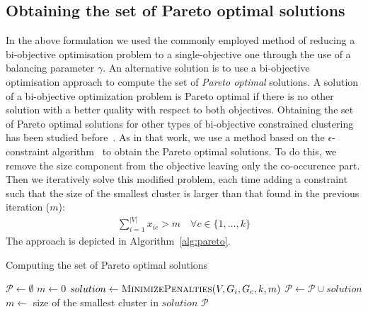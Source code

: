 \documentclass[conference]{IEEEtran}
\newcommand{\NDTi}[1]{\todo[inline,bordercolor=ghue,color=ghue!40]{Tias: #1}}
\begin{document}
\subsection{Obtaining the set of Pareto optimal solutions}
In the above formulation we used the commonly employed method of reducing a bi-objective optimisation problem to a single-objective one through the use of a balancing parameter $\gamma$. An alternative solution is to use a bi-objective optimisation approach to compute the set of \emph{Pareto optimal} solutions. A solution of a bi-objective optimization problem is Pareto optimal if there is no other solution with a better quality with respect to both objectives. Obtaining the set of Pareto optimal solutions for other types of bi-objective constrained clustering has been studied before~\cite{GunsDVD16}. As in that work, we use a method based on the $\epsilon$-constraint algorithm~\cite{DBLP0015143} to obtain the Pareto optimal solutions. To do this, we remove the size component from the objective leaving only the co-occurence part. Then we iteratively solve this modified problem, each time adding a constraint such that the size of the smallest cluster is larger than that found in the previous iteration ($m$):
%
\begin{align}
\sum_{i=1}^{|V|} x_{ic} > m \quad \forall c \in \{1, \ldots, k\}
\end{align}
The approach is depicted in Algorithm~\ref{alg:pareto}.

\begin{algorithm}[t]
\centering
\caption{Computing the set of Pareto optimal solutions}
\label{alg:pareto}
\begin{algorithmic}[1]
\State $\mathcal{P} \gets \emptyset$ 
\State $m \gets 0$ 
\Repeat
	\State $solution \gets \textsc{MinimizePenalties}(V, G_i, G_c, k, m)$
	\State $\mathcal{P} \gets \mathcal{P} \cup solution$
	\State $m \gets$ size of the smallest cluster in $solution$
\State \Return $\mathcal{P}$
\end{algorithmic}
\end{algorithm}

\end{document}
